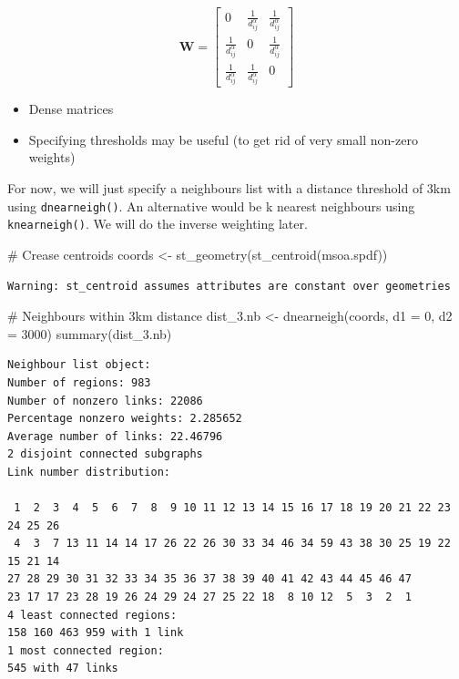 \documentclass[
  letterpaper,
]{scrbook}
\newenvironment{Shaded}{\begin{snugshade}}{\end{snugshade}}
\newcommand{\AttributeTok}[1]{\textcolor[rgb]{0.40,0.45,0.13}{#1}}
\newcommand{\CommentTok}[1]{\textcolor[rgb]{0.37,0.37,0.37}{#1}}
\newcommand{\DecValTok}[1]{\textcolor[rgb]{0.68,0.00,0.00}{#1}}
\newcommand{\FunctionTok}[1]{\textcolor[rgb]{0.28,0.35,0.67}{#1}}
\newcommand{\NormalTok}[1]{\textcolor[rgb]{0.00,0.23,0.31}{#1}}
\newcommand{\OtherTok}[1]{\textcolor[rgb]{0.00,0.23,0.31}{#1}}
\begin{document}
\[
\boldsymbol{\mathbf{W}} = \begin{bmatrix} 
            0 & \frac{1}{d_{ij}^\alpha} & \frac{1}{d_{ij}^\alpha}  \\
\frac{1}{d_{ij}^\alpha} & 0 & \frac{1}{d_{ij}^\alpha}  \\
\frac{1}{d_{ij}^\alpha} & \frac{1}{d_{ij}^\alpha} & 0  
\end{bmatrix}   \nonumber
\]

\begin{itemize}
\item
  Dense matrices
\item
  Specifying thresholds may be useful (to get rid of very small non-zero
  weights)
\end{itemize}

For now, we will just specify a neighbours list with a distance
threshold of 3km using \texttt{dnearneigh()}. An alternative would be k
nearest neighbours using \texttt{knearneigh()}. We will do the inverse
weighting later.

\begin{Shaded}
\begin{Highlighting}[]
\CommentTok{\# Crease centroids}
\NormalTok{coords }\OtherTok{\textless{}{-}} \FunctionTok{st\_geometry}\NormalTok{(}\FunctionTok{st\_centroid}\NormalTok{(msoa.spdf))}
\end{Highlighting}
\end{Shaded}

\begin{verbatim}
Warning: st_centroid assumes attributes are constant over geometries
\end{verbatim}

\begin{Shaded}
\begin{Highlighting}[]
\CommentTok{\# Neighbours within 3km distance}
\NormalTok{dist\_3.nb }\OtherTok{\textless{}{-}} \FunctionTok{dnearneigh}\NormalTok{(coords, }\AttributeTok{d1 =} \DecValTok{0}\NormalTok{, }\AttributeTok{d2 =} \DecValTok{3000}\NormalTok{)}
\FunctionTok{summary}\NormalTok{(dist\_3.nb)}
\end{Highlighting}
\end{Shaded}

\begin{verbatim}
Neighbour list object:
Number of regions: 983 
Number of nonzero links: 22086 
Percentage nonzero weights: 2.285652 
Average number of links: 22.46796 
2 disjoint connected subgraphs
Link number distribution:

 1  2  3  4  5  6  7  8  9 10 11 12 13 14 15 16 17 18 19 20 21 22 23 24 25 26 
 4  3  7 13 11 14 14 17 26 22 26 30 33 34 46 34 59 43 38 30 25 19 22 15 21 14 
27 28 29 30 31 32 33 34 35 36 37 38 39 40 41 42 43 44 45 46 47 
23 17 17 23 28 19 26 24 29 24 27 25 22 18  8 10 12  5  3  2  1 
4 least connected regions:
158 160 463 959 with 1 link
1 most connected region:
545 with 47 links
\end{verbatim}
\end{document}

